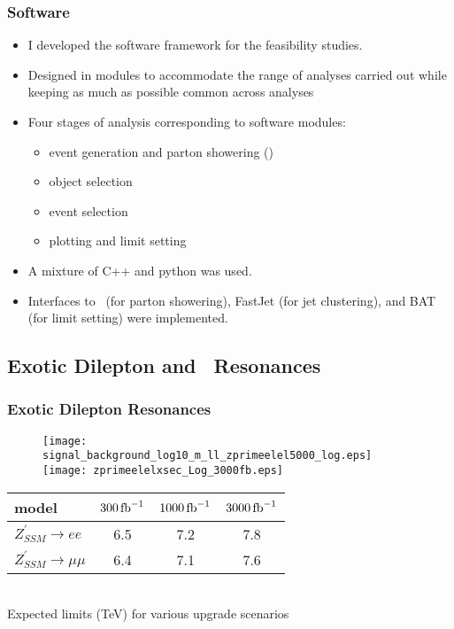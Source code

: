 \begin{frame}
    \frametitle{Software}
    \begin{itemize}
\item I developed the software framework for the feasibility studies.
\item Designed in modules to accommodate the range of analyses carried
    out while keeping as much as possible common across analyses

\item Four stages of analysis corresponding to software modules:
    \begin{itemize}
        \item event generation and parton showering (\pythia)
        \item object selection
        \item event selection
        \item plotting and limit setting
    \end{itemize}

\item A mixture of C++ and python was used.
\item Interfaces to \pythia\ (for parton showering), FastJet (for jet
    clustering), and BAT (for limit setting) were implemented.
\end{itemize}

\end{frame}

\subsection{Exotic Dilepton and \ttbar\ Resonances}

\begin{frame}
    \frametitle{Exotic Dilepton Resonances}
\centering
\begin{figure}
\texttt{[image: signal\_background\_log10\_m\_ll\_zprimeelel5000\_log.eps]}
\texttt{[image: zprimeelelxsec\_Log\_3000fb.eps]}
\end{figure}

\begin{tabular}{lccc}
\hline
model              & $300\,{\rm fb}^{-1}$  & $1000\,{\rm fb}^{-1}$     & $3000\,{\rm fb}^{-1}$  \\
\hline
\hline
$Z^\prime_{SSM} \to ee$ & 6.5  & 7.2   & 7.8   \\
$Z^\prime_{SSM} \to \mu \mu$ & 6.4  & 7.1   & 7.6   \\
\hline
\end{tabular}
\vspace{5pt} \\
\noindent Expected limits (TeV) for various upgrade scenarios
\end{frame}

